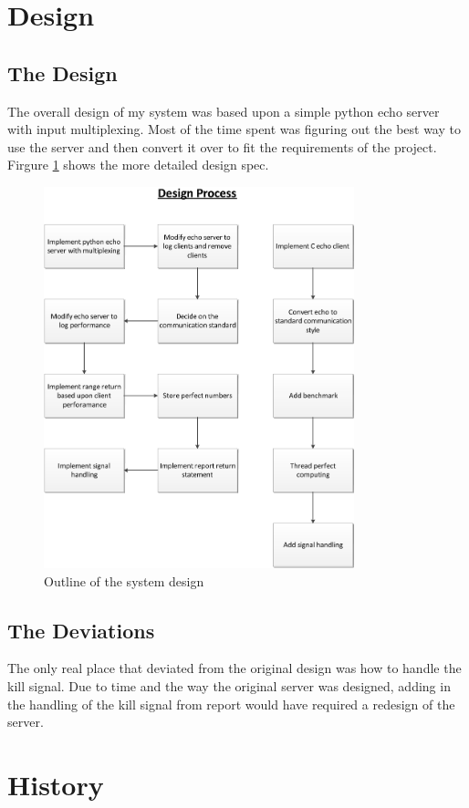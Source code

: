 \documentclass[letterpaper,10pt,titlepage]{article}
\begin{document}
\section{Design}
\label{System Design & Deviations}

\subsection{The Design}
\label{DesingProcess}
The overall design of my system was based upon a simple python echo server with input multiplexing. Most of the time spent was figuring out the best way to use the server and then convert it over to fit the requirements of the project. Firgure \ref{overflow} shows the more detailed design spec.
\begin{figure}[ht!]
\centering
\includegraphics[width=90mm]{HW5Design.eps}
\caption{Outline of the system design}
\label{overflow}
\end{figure}

\subsection{The Deviations}
\label{Deviations}
The only real place that deviated from the original design was how to handle the kill signal. Due to time and the way the original server was designed, adding in the handling of the kill signal from report would have required a redesign of the server.
\section{History}
\label{myar Revision History}

\end{document}

